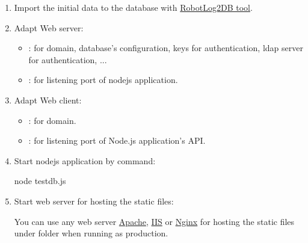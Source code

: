 \begin{enumerate}
\begin{itemize}
\begin{itemize}
\item create all store procedures by loading all SQL scripts under
       folder then execute them.

\begin{boxhint}{Notice}
If you have created your schema with other name than the default
name \emph{pjcmd\_bvt}, you should replace the schema name before executing SQL
scripts.
\end{boxhint}

\end{itemize}

\end{itemize}

\item Import the initial data to the database with \href{https://github.com/test-fullautomation/robotframework-robotlog2db}{RobotLog2DB tool}.

\item Adapt Web server:
\begin{itemize}
   \item {}: for domain, database's configuration,
         keys for authentication, ldap server for authentication, ...
   \item {}: for listening port of nodejs application.
\end{itemize}

\item Adapt Web client:
\begin{itemize}
   \item {}: for domain.
   \item {}: for
         listening port of Node.js application's API.
\end{itemize}

\item Start nodejs application by command:
\begin{robotlog}
node testdb.js
\end{robotlog}

\item Start web server for hosting the static files:

You can use any web server \href{https://httpd.apache.org/}{Apache},
\href{https://www.iis.net/}{IIS} or \href{https://www.nginx.com/}{Nginx} for
hosting the static files under  folder when running
as production.


\end{enumerate}
